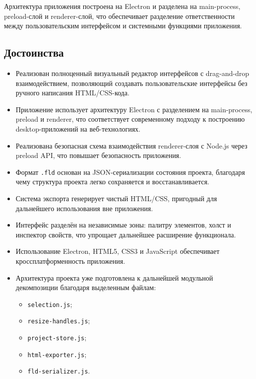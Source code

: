 \documentclass[14pt,a4paper]{extarticle}
\begin{document}
{{Архитектура приложения построена на Electron и разделена на main-process, preload-слой и renderer-слой, что обеспечивает разделение ответственности между пользовательским интерфейсом и системными функциями приложения.

\subsection{Достоинства}

\begin{itemize}
    \item Реализован полноценный визуальный редактор интерфейсов с drag-and-drop взаимодействием, позволяющий создавать пользовательские интерфейсы без ручного написания HTML/CSS-кода.

    \item Приложение использует архитектуру Electron с разделением на main-process, preload и renderer, что соответствует современному подходу к построению desktop-приложений на веб-технологиях.

    \item Реализована безопасная схема взаимодействия renderer-слоя с Node.js через preload API, что повышает безопасность приложения.

    \item Формат \texttt{.fld} основан на JSON-сериализации состояния проекта, благодаря чему структура проекта легко сохраняется и восстанавливается.

    \item Система экспорта генерирует чистый HTML/CSS, пригодный для дальнейшего использования вне приложения.

    \item Интерфейс разделён на независимые зоны: палитру элементов, холст и инспектор свойств, что упрощает дальнейшее расширение функционала.

    \item Использование Electron, HTML5, CSS3 и JavaScript обеспечивает кроссплатформенность приложения.

    \item Архитектура проекта уже подготовлена к дальнейшей модульной декомпозиции благодаря выделенным файлам:
    \begin{itemize}
        \item \texttt{selection.js};
        \item \texttt{resize-handles.js};
        \item \texttt{project-store.js};
        \item \texttt{html-exporter.js};
        \item \texttt{fld-serializer.js}.
    \end{itemize}
\end{itemize}

}}
\end{document}
